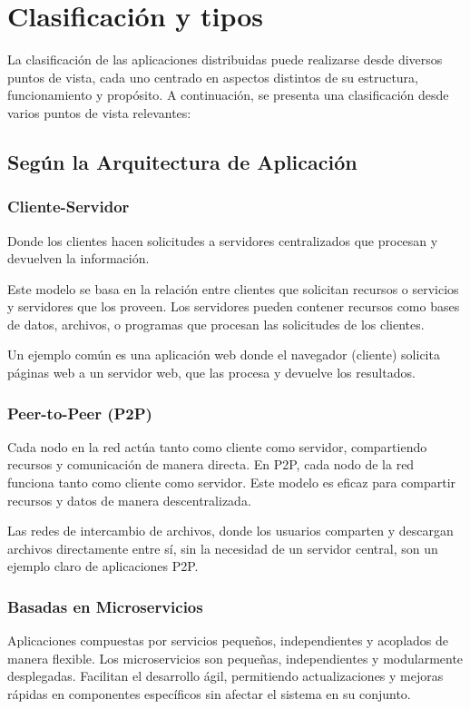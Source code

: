 \section{Clasificación y tipos}

La clasificación de las aplicaciones distribuidas puede realizarse desde diversos puntos de vista, cada uno centrado en aspectos distintos de su estructura, funcionamiento y propósito. A continuación, se presenta una clasificación desde varios puntos de vista relevantes:

\subsection{Según la Arquitectura de Aplicación}

\subsubsection{Cliente-Servidor}
Donde los clientes hacen solicitudes a servidores centralizados que procesan y devuelven la información.

Este modelo se basa en la relación entre clientes que solicitan recursos o servicios y servidores que los proveen. Los servidores pueden contener recursos como bases de datos, archivos, o programas que procesan las solicitudes de los clientes.

Un ejemplo común es una aplicación web donde el navegador (cliente) solicita páginas web a un servidor web, que las procesa y devuelve los resultados.

\subsubsection{Peer-to-Peer (P2P)}
Cada nodo en la red actúa tanto como cliente como servidor, compartiendo recursos y comunicación de manera directa. En P2P, cada nodo de la red funciona tanto como cliente como servidor. Este modelo es eficaz para compartir recursos y datos de manera descentralizada.

Las redes de intercambio de archivos, donde los usuarios comparten y descargan archivos directamente entre sí, sin la necesidad de un servidor central, son un ejemplo claro de aplicaciones P2P.

\subsubsection{Basadas en Microservicios}
Aplicaciones compuestas por servicios pequeños, independientes y acoplados de manera flexible. Los microservicios son pequeñas, independientes y modularmente desplegadas. Facilitan el desarrollo ágil, permitiendo actualizaciones y mejoras rápidas en componentes específicos sin afectar el sistema en su conjunto.

